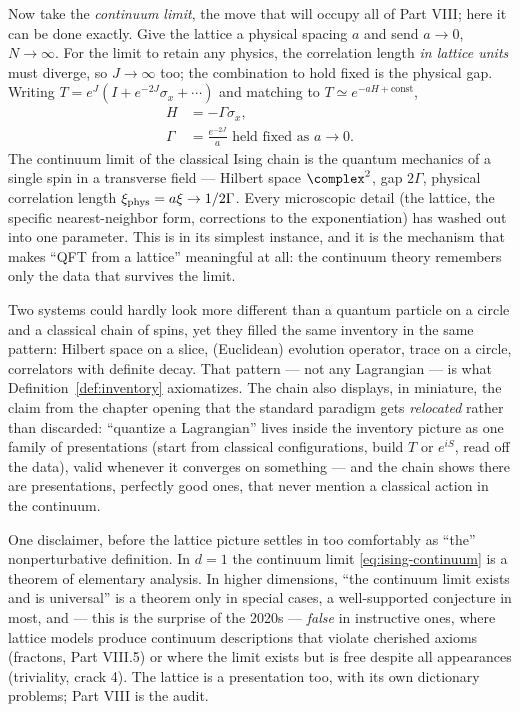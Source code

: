 \begin{eexample}
Now take the \emph{continuum limit}, the move that will occupy all of Part VIII;
here it can be done exactly. Give the lattice a physical spacing $a$ and send $a
\to 0$, $N \to \infty$. For the limit to retain any physics, the correlation
length \emph{in lattice units} must diverge, so $J \to \infty$ too; the
combination to hold fixed is the physical gap. Writing $T = e^J\left(I +
e^{-2J}\sigma_x + \cdots\right)$ and matching to $T \simeq e^{-aH +
\text{const}}$,
\begin{equation}
\begin{aligned}
H &= -\Gamma \sigma_x,\\
\Gamma &= \frac{e^{-2J}}{a} \text{ held fixed as } a \to 0 .
\end{aligned}
\label{eq:ising-continuum}
\end{equation}
The continuum limit of the classical Ising chain is the quantum mechanics of a
single spin in a transverse field --- Hilbert space $\complex^2$, gap $2\Gamma$,
physical correlation length $\xi_{\rm phys} = a\xi \to 1/2\Gamma$. Every
microscopic detail (the lattice, the specific nearest-neighbor form, corrections
to the exponentiation) has washed out into one parameter. This is
 in its simplest instance, and it is the mechanism that makes
``QFT from a lattice'' meaningful at all: the continuum theory remembers only
the data that survives the limit.
\end{eexample}

Two systems could hardly look more different than a quantum particle on a circle
and a classical chain of spins, yet they filled the same inventory in the same
pattern: Hilbert space on a slice, (Euclidean) evolution operator, trace on a
circle, correlators with definite decay. That pattern --- not any Lagrangian ---
is what Definition~\ref{def:inventory} axiomatizes. The chain also displays, in
miniature, the claim from the chapter opening that the standard paradigm gets
\emph{relocated} rather than discarded: ``quantize a Lagrangian'' lives inside
the inventory picture as one family of presentations (start from classical
configurations, build $T$ or $e^{iS}$, read off the data), valid whenever it
converges on something --- and the chain shows there are presentations,
perfectly good ones, that never mention a classical action in the continuum.

One disclaimer, before the lattice picture settles in too comfortably as ``the''
nonperturbative definition. In $d = 1$ the continuum limit
\eqref{eq:ising-continuum} is a theorem of elementary analysis. In higher
dimensions, ``the continuum limit exists and is universal'' is a theorem only in
special cases, a well-supported conjecture in most, and --- this is the surprise
of the 2020s --- \emph{false} in instructive ones, where lattice models produce
continuum descriptions that violate cherished axioms (fractons, Part VIII.5) or
where the limit exists but is free despite all appearances (triviality, crack
4). The lattice is a presentation too, with its own dictionary problems; Part
VIII is the audit.

